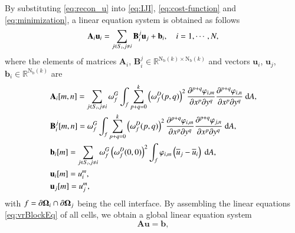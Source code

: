 {
By substituting \eqref{eq:recon_u} into \eqref{eq:IJI}, \eqref{eq:cost-function} and \eqref{eq:minimization}, a linear equation system is obtained as follows
\begin{equation}
    \label{eq:vrBlockEq}
    \mathbf{A}_{i} \mathbf{u}_i
    =
    \sum_{j \in S_i, j \neq i} \mathbf{B}^j_{i} \mathbf{u}_j + \mathbf{b}_{i}, \quad i=1, \cdots, N,
\end{equation}
where the elements of matrices
$\mathbf{A}_i$, $\mathbf{B}^j_i \in \mathbb{R}^{\mathrm{N_b}(k) \times \mathrm{N_b}(k)}$
and vectors $\mathbf{u}_i$, $\mathbf{u}_j$, $\mathbf{b}_i \in \mathbb{R}^{\mathrm{N_b}(k)}$ are
\begin{equation}
    \label{eq:vrCoeffs}
    \begin{aligned}
         & \mathbf{A}_{i} [m,n]=
        \sum_{j \in S_i, j \neq i} \omega_f^G\int_{f}{
            \sum_{p+q=0}^{k}
            \left(\omega_f^D(p,q)\right)^2
            \partialderivative{^{p+q}\varphi_{i,m}}{x^p\partial y^q}
            \partialderivative{^{p+q}\varphi_{i,n}}{x^p\partial y^q}
            \ \dd A},
        \\
         & \mathbf{B}^j_{i} [m,n]=
        \omega_f^G\int_{f}{
            \sum_{p+q=0}^{k}
            \left(\omega_f^D(p,q)\right)^2
            \partialderivative{^{p+q}\varphi_{i,m}}{x^p\partial y^q}
            \partialderivative{^{p+q}\varphi_{j,n}}{x^p\partial y^q}
            \ \dd A},
        \\
         & \mathbf{b}_{i} [m]=
        \sum_{j \in S_i, j \neq i}
        \omega_f^G \left(\omega_f^D(0,0)\right)^2
        \int_{f}{
            \varphi_{i,m} \left(\overline{u}_j - \overline{u}_i\right)
            \ \dd A},
        \\
         & \mathbf{u}_i [m]= u^m_i, \\
         & \mathbf{u}_j [m]= u^m_j,
    \end{aligned}
\end{equation}
with $f= \partial \mathbf{\Omega}_i \cap \partial \mathbf{\Omega}_j$ being the cell interface.}
By assembling the linear equations \eqref{eq:vrBlockEq} of all cells, we obtain a global linear equation system
\begin{equation}
    \label{eq:global-system}
    \mathbf{A} \mathbf{u} = \mathbf{b},
\end{equation}
